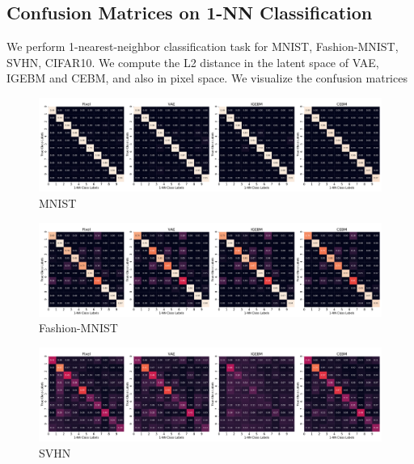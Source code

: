 \subsection{Confusion Matrices on 1-NN Classification}
\label{appendix-sec:confuion matrices}
We perform 1-nearest-neighbor classification task for MNIST, Fashion-MNIST, SVHN, CIFAR10. We compute the L2 distance in the latent space of VAE, IGEBM and CEBM, and also in pixel space. We visualize the confusion matrices
\begin{figure}[!h]
\centering
\vspace*{-2ex}
\includegraphics[width=\linewidth]{figures/confusion_matrix_14row_mnist.pdf}
\vspace*{-6ex}
\caption{MNIST}
\label{appendix:confusion-matrices-mnist}
\end{figure}
\vspace*{-1em}
\begin{figure}[!h]
\centering
\vspace*{-2ex}
\includegraphics[width=\linewidth]{figures/confusion_matrix_14row_fashionmnist.pdf}
\vspace*{-6ex}
\caption{Fashion-MNIST}
\label{appendix:confusion-matrices-fmnist}
\end{figure}
\vspace*{-1em}
\begin{figure}[!h]
\centering
\vspace*{-2ex}
\includegraphics[width=\linewidth]{figures/confusion_matrix_14row_svhn.pdf}
\vspace*{-6ex}
\caption{SVHN}
\label{appendix:confusion-matrices-svhn}
\end{figure}
